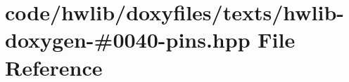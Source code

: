 \hypertarget{hwlib-doxygen-#0040-pins_8hpp}{}\section{code/hwlib/doxyfiles/texts/hwlib-\/doxygen-\/\#0040-\/pins.hpp File Reference}
\label{hwlib-doxygen-#0040-pins_8hpp}
